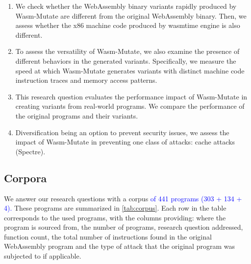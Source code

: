 \documentclass[a4paper,fleqn]{cas-dc}
\newcommand{\tool}{{\sc Wasm-Mutate}\xspace}
\newcommand{\Wasm}{WebAssembly\xspace}
\newcommand{\wasm}{\Wasm}
\newenvironment{revision1}{\color{blue}}{}
\newcommand{\revision}[1]{\textcolor{blue}{#1}}
\begin{document}
\begin{enumerate}[label=RQ\arabic*:, ref=RQ\arabic*]
     \item \label{rq:static} \textbf{\rqstatic}
        We check whether the \wasm binary variants rapidly produced by \tool are different from the original \wasm binary. Then, we assess whether the x86 machine code produced by wasmtime engine is also different.
    
    \item \label{rq:dynamic}\textbf{\rqdynamic}
    To assess the versatility of \tool, we also examine the presence of different behaviors in the generated variants. 
    Specifically, we measure the speed at which \tool generates variants with distinct machine code instruction traces and memory access patterns.
    
        

     \begin{revision1}
        \item \label{rq:performance}\textbf{\rqperformance} This research question evaluates the performance impact of \tool in creating variants from real-world programs. We compare the performance of the original programs and their variants.
     \end{revision1}
     
    \item \label{rq:defensive}\textbf{\rqdefensive} Diversification being an option to prevent security issues,  we assess the impact of \tool in preventing one class of attacks: cache attacks (Spectre).

        
\end{enumerate}


\subsection{Corpora}
\label{sec:corpus}



We answer our research questions with a corpus \revision{ of 441 programs (303 + 134 + 4).}
These programs are summarized in \autoref{tab:corpus}.
Each row in the table corresponds to the used programs, with the columns providing: where the program is sourced from, the number of programs, research question addressed, function count, the total number of instructions found in the original \wasm program and the type of attack that the original program was subjected to if applicable.
\end{document}
